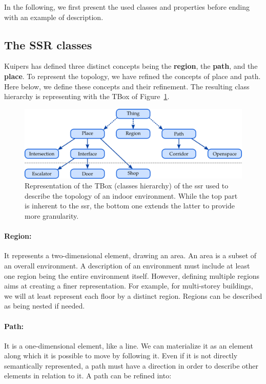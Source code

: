 In the following, we first present the used classes and properties before ending with an example of description.

\subsection{The SSR classes}

Kuipers has defined three distinct concepts being the \textbf{region}, the \textbf{path}, and the \textbf{place}. To represent the topology, we have refined the concepts of place and path. Here below, we define these concepts and their refinement. The resulting class hierarchy is representing with the TBox of Figure~\ref{fig:chap3_tbox}.

\begin{figure}[ht!]
\centering
\includegraphics[scale=0.4]{figures/chapter3/ssr_tbox.png}
\caption{\label{fig:chap3_tbox} Representation of the TBox (classes hierarchy) of the \acrlong{ssr} used to describe the topology of an indoor environment. While the top part is inherent to the \acrshort{ssr}, the bottom one extends the latter to provide more granularity.}
\end{figure}

\paragraph{Region:} It represents a two-dimensional element, drawing an area. An area is a subset of an overall environment. A description of an environment must include at least one region being the entire environment itself. However, defining multiple regions aims at creating a finer representation. For example, for multi-storey buildings, we will at least represent each floor by a distinct region. Regions can be described as being nested if needed.

\paragraph{Path:} It is a one-dimensional element, like a line. We can materialize it as an element along which it is possible to move by following it. Even if it is not directly semantically represented, a path must have a direction in order to describe other elements in relation to it. A path can be refined into:

